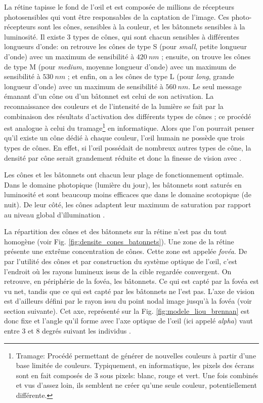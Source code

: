 	\par La rétine tapisse le fond de l'œil et est composée de millions de récepteurs photosensibles qui vont être responsables de la captation de l'image. Ces photo-récepteurs sont les cônes, sensibles à la couleur, et les bâtonnets sensibles à la luminosité. Il existe 3 types de cônes, qui sont chacun sensibles à différentes longueurs d'onde: on retrouve les cônes de type S (pour \textit{small}, petite longueur d'onde) avec un maximum de sensibilité à $420~nm$ ; ensuite, on trouve les cônes de type M (pour \textit{medium}, moyenne longueur d'onde) avec un maximum de sensibilité à $530~nm$ ; et enfin, on a les cônes de type L (pour \textit{long}, grande longueur d'onde) avec un maximum de sensibilité à $560~nm$. Le seul message émanant d'un cône ou d'un bâtonnet est celui de son activation. La reconnaissance des couleurs et de l'intensité de la lumière se fait par la combinaison des résultats d'activation des différents types de cônes ; ce procédé est analogue à celui du tramage\footnote{Tramage: Procédé permettant de générer de nouvelles couleurs à partir d'une base limitée de couleurs. Typiquement, en informatique, les pixels des écrans sont en fait composés de 3 sous pixels: blanc, rouge et vert. Une fois combinés et vus d'assez loin, ils semblent ne créer qu'une seule couleur, potentiellement différente.} en informatique. Alors que l'on pourrait penser qu'il existe un cône dédié à chaque couleur, l'œil humain ne possède que trois types de cônes. En effet, si l'œil possédait de nombreux autres types de cône, la densité par cône serait grandement réduite et donc la finesse de vision avec \citep{glassner_principles_1995}.
	
	\par Les cônes et les bâtonnets ont chacun leur plage de fonctionnement optimale. Dans le domaine photopique (lumière du jour), les bâtonnets sont saturés en luminosité et sont beaucoup moins efficaces que dans le domaine scotopique (de nuit). De leur côté, les cônes adaptent leur maximum de saturation par rapport au niveau global d'illumination \citep{glassner_principles_1995}.
	
	\par La répartition des cônes et des bâtonnets sur la rétine n'est pas du tout homogène (voir Fig. \ref{fig:densite_cones_batonnets}). Une zone de la rétine présente une extrême concentration de cônes. Cette zone est appelée \textit{fovéa}. De par l'utilité des cônes et par construction du système optique de l'œil, c'est l'endroit où les rayons lumineux issus de la cible regardée convergent. On retrouve, en périphérie de la fovéa, les bâtonnets. Ce qui est capté par la fovéa est vu net, tandis que ce qui est capté par les bâtonnets ne l'est pas. L'axe de vision est d'ailleurs défini par le rayon issu du point nodal image jusqu'à la fovéa (voir section suivante). Cet axe, représenté sur la Fig. \ref{fig:modele_liou_brennan} est donc fixe et l'angle qu'il forme avec l'axe optique de l'œil (ici appelé \textit{alpha}) vaut entre 3 et 8 degrés suivant les individus \citep{gross_human_2008}.
	
